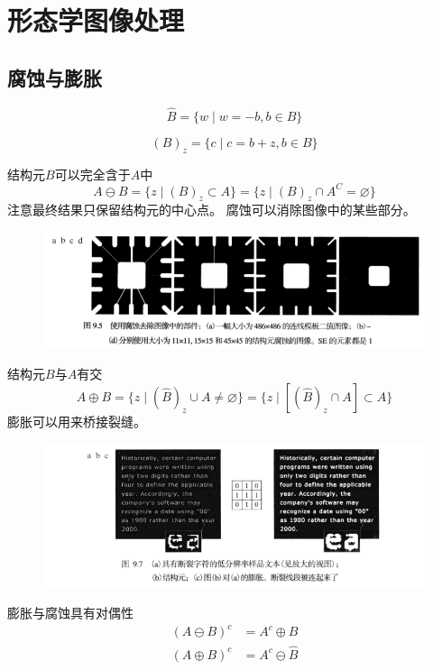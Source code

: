 
\section{形态学图像处理} %
\subsection{腐蚀与膨胀}
\begin{definition}[反射]
\[\hat{B}=\{w\mid w=-b,b\in B\}\]
\end{definition}
\begin{definition}[平移]
\[(B)_z=\{c\mid c=b+z,b\in B\}\]
\end{definition}
\begin{definition}[腐蚀]
结构元$B$可以完全含于$A$中
\[A\ominus B=\{z\mid(B)_z\subset A\}=\{z\mid(B)_z\cap A^C=\varnothing\}\]
注意最终结果只保留结构元的中心点。
腐蚀可以消除图像中的某些部分。
\end{definition}
\begin{figure}[H]
\centering
\includegraphics[width=0.9\linewidth]{fig/erosion.png}
\end{figure}
\begin{definition}[膨胀]
结构元$B$与$A$有交
\[A\oplus B=\{z\mid(\hat{B})_z\cup A\ne\varnothing\}=\{z\mid [(\hat{B})_z\cap A]\subset A\}\]
膨胀可以用来桥接裂缝。
\end{definition}
\begin{figure}[H]
\centering
\includegraphics[width=0.9\linewidth]{fig/dilation.png}
\end{figure}

膨胀与腐蚀具有对偶性
\[\begin{aligned}
(A\ominus B)^c &= A^c\oplus B\\
(A\oplus B)^c &= A^c\ominus \hat{B}
\end{aligned}\]

